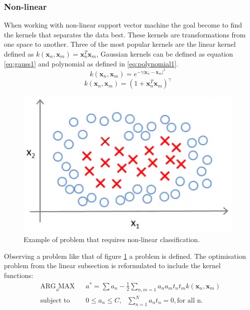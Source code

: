 \subsubsection{Non-linear}
When working with non-linear support vector machine the goal become to find the kernels that separates the data best. These kernels are transformations from one space to another. Three of the most popular kernels are the linear kernel defined as $k( \textbf{x}_n, \textbf{x}_m)= \textbf{x}_n^T\textbf{x}_m$, Gaussian kernels can be defined as equation \ref{eq:gauss1} and polynomial as defined in \ref{eq:polynomial1}.
\begin{equation}
\label{eq:gauss1}
k( \textbf{x}_n, \textbf{x}_m) = e^{-\gamma| \textbf{x}_n -  \textbf{x}_m|^2}
\end{equation}
\begin{equation}
\label{eq:polynomial1}
k( \textbf{x}_n, \textbf{x}_m) = (1+ \textbf{x}_n^T \textbf{x}_m)^{\gamma}
\end{equation}
\begin{figure}[H]
\centering
\includegraphics[scale=.75]{billeder/svm-non-linear}
\caption{Example of problem that requires non-linear classification.}
\label{fig:svm-non-linear}
\end{figure}
Observing a problem like that of figure \ref{fig:svm-non-linear} a problem is defined. The optimisation problem from the linear subsection is reformulated to include the kernel functions:
\begin{equation}
\begin{aligned}
& \underset{a}{\text{ARG MAX}}
& & a^* =  \sum a_n - \frac{1}{2}\sum_{n,m=1} a_na_mt_nt_mk( \textbf{x}_n, \textbf{x}_m) \\
& \text{subject to}
& & 0 \leq a_n \leq C, \text{  } \sum^N_{n=1}a_nt_n = 0, \text{for all n.}
\end{aligned}
\end{equation}
